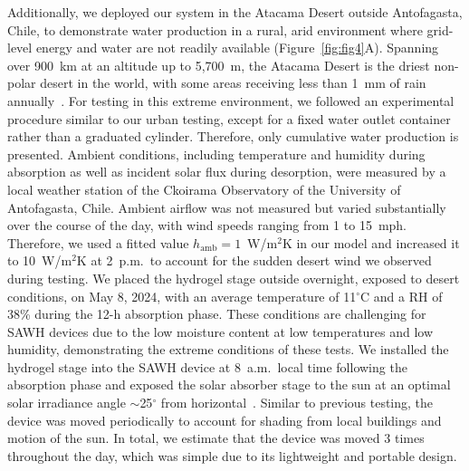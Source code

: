 \documentclass[11pt]{article}
\begin{document}
Additionally, we deployed our system in the Atacama Desert outside Antofagasta, Chile, to demonstrate water production in a rural, arid environment where grid-level energy and water are not readily available (Figure~\ref{fig:fig4}A). Spanning over 900~km at an altitude up to 5,700~m, the Atacama Desert is the driest non-polar desert in the world, with some areas receiving less than 1~mm of rain annually~\cite{bull2018}. For testing in this extreme environment, we followed an experimental procedure similar to our urban testing, except for a fixed water outlet container rather than a graduated cylinder. Therefore, only cumulative water production is presented. Ambient conditions, including temperature and humidity during absorption as well as incident solar flux during desorption, were measured by a local weather station of the Ckoirama Observatory of the University of Antofagasta, Chile. Ambient airflow was not measured but varied substantially over the course of the day, with wind speeds ranging from 1 to 15~mph. Therefore, we used a fitted value $h_{\mathrm{amb}} = 1$~W/m$^2$K in our model and increased it to 10~W/m$^2$K at 2~p.m.\ to account for the sudden desert wind we observed during testing. We placed the hydrogel stage outside overnight, exposed to desert conditions, on May 8, 2024, with an average temperature of 11$^\circ$C and a RH of 38\% during the 12-h absorption phase. These conditions are challenging for SAWH devices due to the low moisture content at low temperatures and low humidity, demonstrating the extreme conditions of these tests. We installed the hydrogel stage into the SAWH device at 8~a.m.\ local time following the absorption phase and exposed the solar absorber stage to the sun at an optimal solar irradiance angle $\sim$25$^\circ$ from horizontal~\cite{tutiempo2024}. Similar to previous testing, the device was moved periodically to account for shading from local buildings and motion of the sun. In total, we estimate that the device was moved 3 times throughout the day, which was simple due to its lightweight and portable design.
\end{document}
